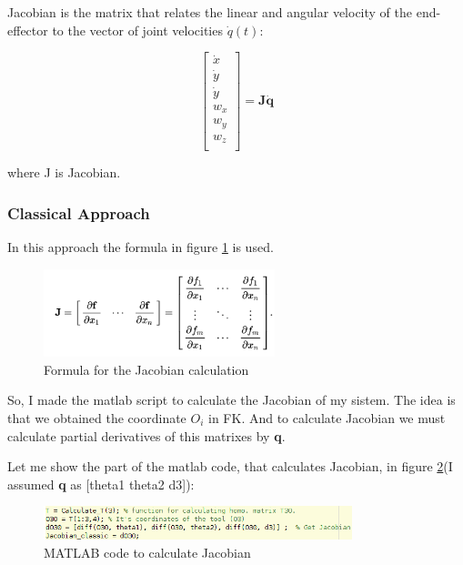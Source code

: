 \documentclass[12pt, a4paper]{report}
\begin{document}
Jacobian is the matrix that relates the linear and angular velocity of the end-effector to the vector of joint velocities \textbf{$\dot{q}(t)$}:

\begin{equation}
        \begin{bmatrix}
                \dot{x}\\
                \dot{y}\\
                \dot{y} \\
                {w_x} \\
                {w_y} \\
                {w_z} \\
        \end{bmatrix}= \bm{J}\bm{\dot{q}}   
        \label{eq:18}
\end{equation}

where J is Jacobian.

{\centering
\subsubsection*{Classical Approach}
}

In this approach the formula in figure \ref{fig:mesh3} is used.
\begin{figure}[H]
	\centering
		\includegraphics[width=0.6\textwidth]{Image3} %
	\caption{Formula for the Jacobian calculation } %
	\label{fig:mesh3}
\end{figure}

So, I made the matlab script to calculate the Jacobian of my sistem. The idea is that we obtained the coordinate $O_i$ in FK. And to calculate Jacobian we must calculate partial derivatives of this matrixes by \textbf{q}. 

Let me show the part of the matlab code, that calculates Jacobian, in figure \ref{fig:mesh4}(I assumed \textbf{q} as [theta1 theta2 d3]):


\begin{figure}[H]
	\centering
		\includegraphics[width=0.8\textwidth]{Image4} %
	\caption{MATLAB code to calculate Jacobian} %
	\label{fig:mesh4}
\end{figure}
\end{document}
